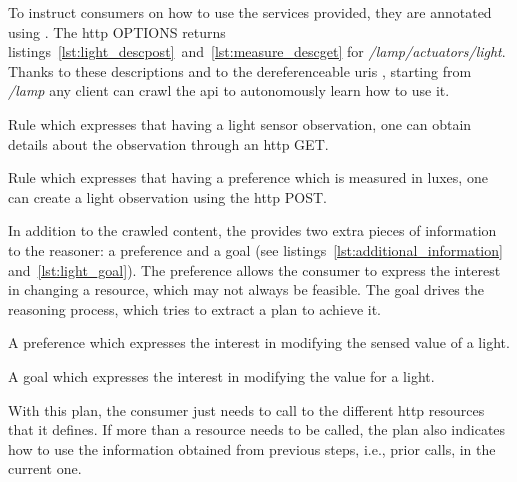 
To instruct consumers on how to use the services provided, they are annotated using \restdesc{}.
The \acs{http} OPTIONS returns listings~\ref{lst:light_descpost}~and~\ref{lst:measure_descget} for \emph{/lamp/actuators/light}.
Thanks to these descriptions and to the dereferenceable \acsp{uri} \citep{sauermann_cool_2008}, starting from \emph{/lamp} any client can crawl the \acs{api} to autonomously learn how to use it.

\begin{listing}
  
  \caption[Rule which describes the \acs{http} GET for a resource]{Rule which expresses that having a light sensor observation, one can obtain details about the observation through an \acs{http} GET.}
  \label{lst:measure_descget}
\end{listing}

\begin{listing}
  
  \caption[Rule which describes the \acs{http} POST for a resource]{Rule which expresses that having a preference which is measured in luxes, one can create a light observation using the \acs{http} POST.}
  \label{lst:light_descpost}
\end{listing}


In addition to the crawled content, the \nodeConsRest{} provides two extra pieces of information to the reasoner: a preference and a goal (see listings~\ref{lst:additional_information} and~\ref{lst:light_goal}).
The preference allows the consumer to express the interest in changing a resource, which may not always be feasible.
The goal drives the reasoning process, which tries to extract a plan to achieve it.

\begin{listing}
  
  \caption[Semantically described light preference]{A preference which expresses the interest in modifying the sensed value of a light.}
  \label{lst:additional_information}
\end{listing}

\begin{listing}
  
  \caption[Goal rule to change the light level]{A goal which expresses the interest in modifying the value for a light.}
  \label{lst:light_goal}
\end{listing}

With this plan, the consumer just needs to call to the different \acs{http} resources that it defines.
If more than a resource needs to be called, the plan also indicates how to use the information obtained from previous steps, i.e., prior calls, in the current one.